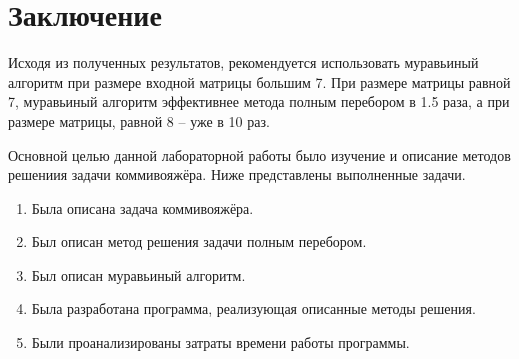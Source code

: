 \chapter*{Заключение}

Исходя из полученных результатов, рекомендуется использовать муравьиный алгоритм при размере входной матрицы большим 7.
При размере матрицы равной 7, муравьиный алгоритм эффективнее метода полным перебором в 1.5 раза, а при размере матрицы, равной 8 -- уже в 10 раз.

Основной целью данной лабораторной работы было изучение и описание методов решениия задачи коммивояжёра.
Ниже представлены выполненные задачи.

\begin{enumerate}
\item Была описана задача коммивояжёра.
\item Был описан метод решения задачи полным перебором.
\item Был описан муравьиный алгоритм.
\item Была разработана программа, реализующая описанные методы решения.
\item Были проанализированы затраты времени работы программы.
\end{enumerate}
